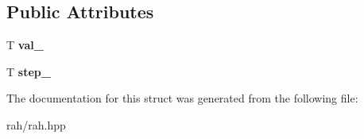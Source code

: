 \subsection*{Public Attributes}
\begin{DoxyCompactItemize}
\item 
\mbox{\label{struct_r_a_h___n_a_m_e_s_p_a_c_e_1_1view_1_1iota__iterator_a7c50734cf92624116dacd9fb2317a10c}} 
T {\bfseries val\+\_\+}
\item 
\mbox{\label{struct_r_a_h___n_a_m_e_s_p_a_c_e_1_1view_1_1iota__iterator_a03c5e6622e2b4b382b26d7de3d2eab00}} 
T {\bfseries step\+\_\+}
\end{DoxyCompactItemize}


The documentation for this struct was generated from the following file\+:\begin{DoxyCompactItemize}
\item 
rah/rah.\+hpp\end{DoxyCompactItemize}

